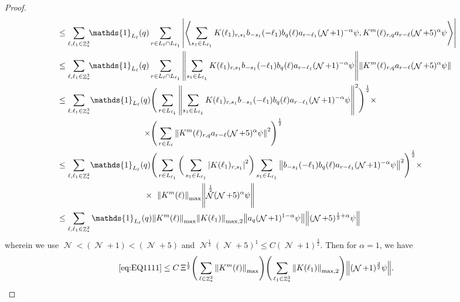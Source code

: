 \documentclass[sn-mathphys, Numbered ,a4paper]{sn-jnl}%
\DeclareMathOperator{\Z}{\mathbb{Z}}
\DeclareMathOperator{\NN}{\mathcal{N}}
\newcommand{\half}{\frac{1}{2}}
\newcommand{\eva}[1]{\left\langle #1 \right\rangle}
\theoremstyle{plain}
\theoremstyle{definition}
\theoremstyle{remark}
\theoremstyle{plain}
\theoremstyle{definition}
\theoremstyle{remark}
\begin{document}
\begin{proof}
\begin{align}
    &\leq \sum\limits_{\ell,\ell_1 \in \Z^3_*} \!\!\mathds{1}_{L_\ell}(q) \sum\limits_{ r \in L_\ell \cap L_{\ell_1}} \abs{\eva{ \sum\limits_{s_1 \in L_{\ell_1}} K(\ell_1)_{r,s_1} b_{-s_1}(-\ell_1) b_{q}(\ell) a_{r-\ell_1} (\NN+1)^{-\alpha} \psi, K^{m}(\ell)_{r,q} a_{r-\ell} (\NN+5)^{\alpha} \psi }}\nonumber\\
    &\leq\sum\limits_{\ell,\ell_1 \in \Z^3_*} \!\!\mathds{1}_{L_\ell}(q) \sum\limits_{ r \in L_\ell \cap L_{\ell_1}}    \norm{\sum\limits_{s_1 \in L_{\ell_1}} K(\ell_1)_{r,s_1} b_{-s_1}(-\ell_1) b_{q}(\ell) a_{r-\ell_1} (\NN+1)^{-\alpha}\psi}\norm{  K^{m}(\ell)_{r,q}  a_{r-\ell} (\NN+5)^{\alpha}\psi } \nonumber\\
    &\leq \sum\limits_{\ell.\ell_1 \in \Z^3_*} \!\!\begin{aligned}[t]\mathds{1}_{L_\ell}(q) \Bigg( &\sum\limits_{r \in L_{\ell_1}} \norm{\sum\limits_{s_1 \in L_{\ell_1}} K(\ell_1)_{r,s_1} b_{-s_1}(-\ell_1) b_{q}(\ell) a_{r-\ell_1} (\NN+1)^{-\alpha}\psi}^2\Bigg)^\half \times\nonumber\\
    \times \Bigg( &\sum\limits_{r \in L_\ell}  \norm{  K^{m}(\ell)_{r,q}  a_{r-\ell} (\NN+5)^{\alpha}\psi }^2\Bigg)^\half \end{aligned}\nonumber\\
    &\leq \sum\limits_{\ell,\ell_1 \in \Z^3_*} \!\!\begin{aligned}[t]\mathds{1}_{L_\ell}(q) \Bigg( &\sum\limits_{r \in L_{\ell_1}} \bigg( \sum\limits_{s_1 \in L_{\ell_1}}\abs{K(\ell_1)_{r,s_1}}^2\bigg) \sum\limits_{s_1 \in L_{\ell_1}} \norm{ b_{-s_1}(-\ell_1) b_{q}(\ell) a_{r-\ell_1} (\NN+1)^{-\alpha}\psi}^2\Bigg)^\half \times\nonumber\\
    \times \;\,\, &\norm{K^{m}(\ell)}_{\mathrm{max}} \norm{ \NN^\half(\NN+5)^{\alpha}\psi }\end{aligned} \nonumber\\
    &\leq \sum\limits_{\ell,\ell_1 \in \Z^3_*}\mathds{1}_{L_\ell}(q) \norm{  K^{m}(\ell)}_{\mathrm{max}}  \norm{K(\ell_1)}_{\mathrm{max,2}}   \norm{   a_{q}(\NN+1)^{1-\alpha}\psi} \norm{  (\NN+5)^{\half+\alpha}\psi } \nonumber\\
\end{align}
wherein we use $\NN<(\NN+1)<(\NN+5)$ and $\NN^\half(\NN+5)^1\leq C(\NN+1)^{\frac{3}{2}}$. Then for $\alpha = 1$, we have
\begin{equation}
    \eqref{eq:EQ1111}\leq C\, \Xi^\half \Bigg(\sum\limits_{\ell \in \Z^3_*} \norm{K^m(\ell)}_{\mathrm{max}}\Bigg)\Bigg( \sum\limits_{\ell_1 \in \Z^3_*}\norm{K(\ell_1)}_{\mathrm{max,2}} \Bigg)  \norm { (\NN+1)^{\frac{3}{2}} \psi }. \label{eq:estEQ1111}    

\end{equation}
\end{proof}
\end{document}
